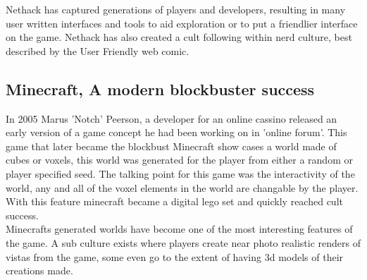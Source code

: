 Nethack has captured generations of players and developers, resulting in many 
user written interfaces and tools to aid exploration or to put a friendlier 
interface on the game. Nethack has also created a cult following within nerd 
culture, best described by the User Friendly web comic.\\

\subsection*{Minecraft, A modern blockbuster success}
In 2005 Marus 'Notch' Peerson, a developer for an online cassino released an
early version of a game concept he had been working on in 'online forum'. This
game that later became the blockbust Minecraft show cases a world made of cubes 
or voxels, this world was generated for the player from either a random or 
player specified seed. The talking point for this game was the interactivity of
the world, any and all of the voxel elements in the world are changable by the
player. With this feature minecraft became a digital lego set and quickly 
reached cult success.\\


Minecrafts generated worlds have become one of the most interesting features of 
the game. A sub culture exists where players create near photo realistic renders
of vistas from the game, some even go to the extent of having 3d models of their
creations made. \\



 

